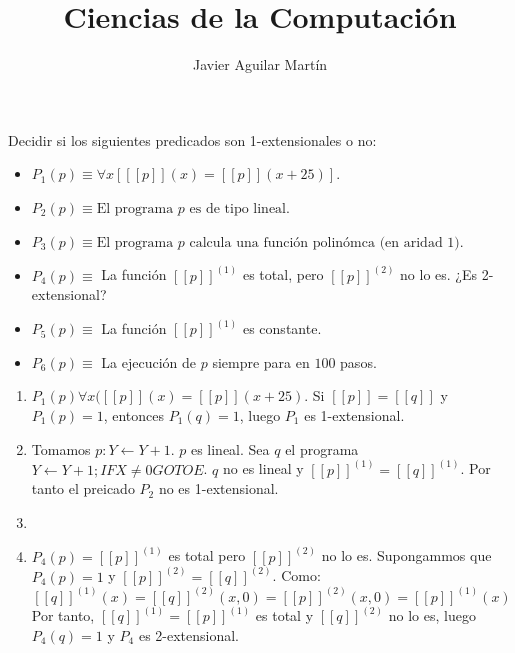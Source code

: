 \documentclass[twoside]{article}
\begin{document}
\title{Ciencias de la Computación}

\author{Javier Aguilar Martín}
\maketitle

\begin{ejercicio}{1}
Decidir si los siguientes predicados son 1-extensionales o no:
\begin{itemize}
	\item $P_1(p) \equiv \forall x [[\![p]\!](x) = [[p]](x+25)]$.
	\item $P_2(p) \equiv \text{El programa }p\text{ es de tipo lineal}$.
	\item $P_3(p) \equiv \text{El programa }p\text{ calcula una función polinómca (en aridad 1)}$.
	\item $P_4(p) \equiv$ La función $[[p]]^{(1)}$ es total, pero $[[p]]^{(2)}$ no lo es. ¿Es 2-extensional?
	\item $P_5(p) \equiv$ La función $[[p]]^{(1)}$ es constante.
	\item $P_6(p) \equiv$ La ejecución de $p$ siempre para en $100$ pasos.
\end{itemize}
\end{ejercicio}
\begin{solucion}
\end{solucion}
\begin{enumerate}
	\item $P_1(p)  \forall x ( [[p]](x) = [[p]](x+25)$. Si $[[p]]=[[q]]$ y $P_1(p) = 1$, entonces $P_1(q) = 1$, luego $P_1$ es 1-extensional.
	
	\item Tomamos $p : Y \leftarrow Y+1$. $p$ es lineal. Sea $q$ el programa $Y \leftarrow Y+1; IF X \neq 0 GOTO E$. $q$ no es lineal y $[[p]]^{(1)} = [[q]]^{(1)}$. Por tanto el preicado $P_2$ no es 1-extensional.
	
	\item
	\item $P_4(p) = [[p]]^{(1)}$ es total pero $[[p]]^{(2)}$ no lo es. Supongammos que $P_4(p) = 1$ y $[[p]]^{(2)} = [[q]]^{(2)}$. Como:
	\[ [[q]]^{(1)}(x) = [[q]]^{(2)}(x,0) = [[p]]^{(2)}(x,0) = [[p]]^{(1)}(x) \]
	Por tanto, $[[q]]^{(1)} = [[p]]^{(1)}$ es total y $[[q]]^{(2)}$ no lo es, luego $P_4(q) = 1$ y $P_4$ es 2-extensional.
\end{enumerate}

\newpage
\end{document}
